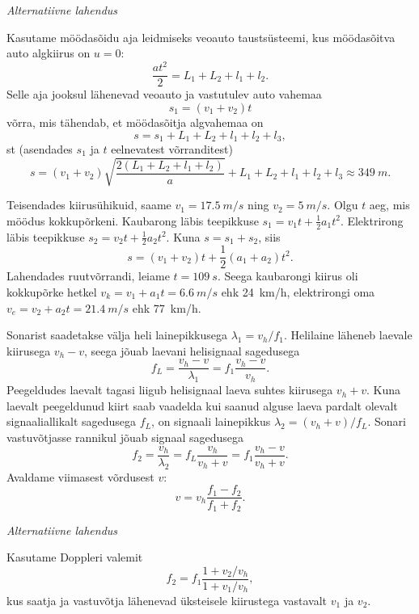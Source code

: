 \documentclass[10pt, twoside]{article}
\begin{document}
{\emph{Alternatiivne lahendus}

Kasutame möödasõidu aja leidmiseks veoauto taustsüsteemi, kus möödasõitva auto
algkiirus on $u = 0$:
\[
\frac{at^2}{2} = L_1 + L_2 + l_1 + l_2.
\]
Selle aja jooksul lähenevad veoauto ja vastutulev auto vahemaa
\[
s_1 = (v_1 + v_2)t 
\]
võrra, mis tähendab, et möödasõitja algvahemaa on
\[
s = s_1 + L_1 + L_2 + l_1 + l_2 + l_3 ,
\]
st (asendades $s_1$ ja $t$ eelnevatest võrranditest)
\[
s=\left(v_{1}+v_{2}\right) \sqrt{\frac{2\left(L_{1}+L_{2}+l_{1}+l_{2}\right)}{a}}+L_{1}+L_{2}+l_{1}+l_{2}+l_{3} \approx \SI{349}{m}.
\]
\probend
\bigskip


\solu
Teisendades kiirusühikuid, saame $v_1 = \SI{17,5}{m/s}$ ning $v_2 = \SI{5}{m/s}$. Olgu $t$ aeg, mis möödus kokkupõrkeni. Kaubarong läbis teepikkuse $s_1 = v_1t + \frac{1}{2}a_1t^2$. Elektrirong läbis teepikkuse $s_2 = v_2t + \frac{1}{2}a_2t^2$. Kuna $s = s_1 + s_2$, siis
\[
s=\left(v_{1}+v_{2}\right) t+\frac{1}{2}\left(a_{1}+a_{2}\right) t^{2}.
\]
Lahendades ruutvõrrandi, leiame $t = \SI{109}{s}$. Seega kaubarongi kiirus oli kokkupõrke hetkel $v_k = v_1 + a_1t = \SI{6,6}{m/s}$ ehk \SI{24}{km/h}, elektrirongi oma $v_e = v_2 + a_2t = \SI{21,4}{m/s}$ ehk \SI{77}{km/h}.
\probend
\bigskip


\solu
Sonarist saadetakse välja heli lainepikkusega $\lambda_1 = v_h/f_1$. Helilaine läheneb laevale kiirusega $v_h - v$, seega jõuab laevani helisignaal sagedusega
\[
f_L = \frac{v_h-v}{\lambda_1} = f_1 \frac{v_h-v}{v_h}.
\]
Peegeldudes laevalt tagasi liigub helisignaal laeva suhtes kiirusega $v_h + v$. Kuna laevalt peegeldunud kiirt saab vaadelda kui saanud alguse laeva pardalt olevalt signaaliallikalt sagedusega $f_L$, on signaali lainepikkus $\lambda_2 = (v_h+v)/f_L$. Sonari vastuvõtjasse rannikul jõuab signaal sagedusega
\[
f_{2}=\frac{v_{h}}{\lambda_{2}}=f_{L} \frac{v_{h}}{v_{h}+v}=f_{1} \frac{v_{h}-v}{v_{h}+v}.
\]
Avaldame viimasest võrdusest $v$:
\[
v = v_h \frac{f_1-f_2}{f_1+f_2}.
\]

\vspace{0.5\baselineskip}

\emph{Alternatiivne lahendus}

Kasutame Doppleri valemit
\[
f_2 = f_1 \frac{1+v_2/v_h}{1+v_1/v_h},
\]
kus saatja ja vastuvõtja lähenevad üksteisele kiirustega vastavalt $v_1$ ja $v_2$.

}
\end{document}
